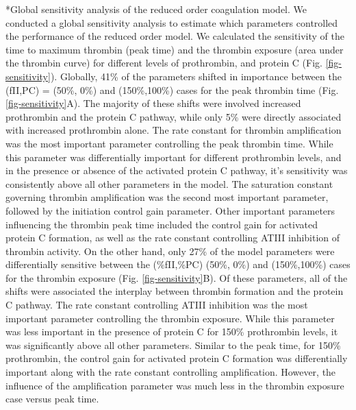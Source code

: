 \documentclass[12pt]{article}
\makeatletter
\renewcommand\subsection{\@startsection
	{subsection}{2}{0mm}
	{-0.05in}
	{-0.5\baselineskip}
	{\normalfont\normalsize\bfseries}}
\makeatother
\begin{document}
\clearpage

\subsection*{Global sensitivity analysis of the reduced order coagulation model.}
We conducted a global sensitivity analysis to estimate which parameters controlled the performance of the reduced order model. 
We calculated the sensitivity of the time to maximum thrombin (peak time) and the thrombin exposure (area under the thrombin curve) 
for different levels of prothrombin, and protein C (Fig. \ref{fig-sensitivity}). 
Globally, 41\% of the parameters shifted in importance between the (fII,PC) = (50\%, 0\%) and (150\%,100\%) cases for the peak thrombin time (Fig. \ref{fig-sensitivity}A). 
The majority of these shifts were involved increased prothrombin and the protein C pathway, while only
5\% were directly associated with increased prothrombin alone. The rate constant for thrombin amplification was the most important parameter controlling the
peak thrombin time. While this parameter was differentially important for different prothrombin levels, and in the presence or absence of 
the activated protein C pathway, it's sensitivity was consistently above all other parameters in the model. The saturation constant governing thrombin amplification was
the second most important parameter, followed by the initiation control gain parameter. Other important parameters influencing the thrombin peak time included the control gain for
activated protein C formation, as well as the rate constant controlling ATIII inhibition of thrombin activity. 
On the other hand, only 27\% of the model parameters were differentially sensitive between the (\%fII,\%PC) (50\%, 0\%) and (150\%,100\%) cases 
for the thrombin exposure (Fig. \ref{fig-sensitivity}B). Of these parameters, all of the shifts were associated the interplay between thrombin formation and the protein C pathway. 
The rate constant controlling ATIII inhibition was the most important parameter controlling the thrombin exposure.
While this parameter was less important in the presence of protein C for 150\% prothrombin levels, it was significantly above all other parameters. 
Similar to the peak time, for 150\% prothrombin, the control gain for activated protein C formation was differentially important along with the rate constant controlling
amplification. However, the influence of the amplification parameter was much less in the thrombin exposure case versus peak time. 
\end{document}

